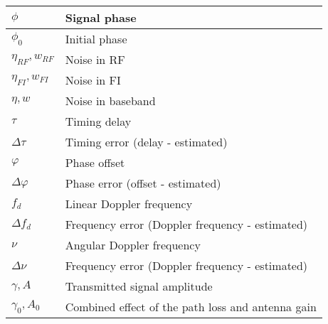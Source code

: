 \documentclass{article}
\begin{document}
\begin{xltabular}{\textwidth}{XX}
    \(\phi\)              & Signal phase\\ \hline
    \(\phi_0\)            & Initial phase\\ \hline
    \(\eta_{RF}, w_{RF}\) & Noise in RF\\ \hline
    \(\eta_{FI}, w_{FI}\) & Noise in FI\\ \hline
    \(\eta, w\)           & Noise in baseband\\ \hline
    \(\tau\)              & Timing delay \\ \hline
    \(\Delta\tau\)        & Timing error (delay - estimated) \\ \hline
    \(\varphi\)           & Phase offset \\ \hline
    \(\Delta\varphi\)     & Phase error (offset - estimated) \\ \hline
    \(f_d\)               & Linear Doppler frequency\\ \hline
    \(\Delta f_d\)        & Frequency error (Doppler frequency - estimated)\\ \hline
    \(\nu\)               & Angular Doppler frequency\\ \hline
    \(\Delta \nu\)        & Frequency error (Doppler frequency - estimated)\\ \hline
    \(\gamma, A\)         & Transmitted signal amplitude\\ \hline
    \(\gamma_0, A_0\)     & Combined effect of the path loss and antenna gain
\end{xltabular}
\end{document}
